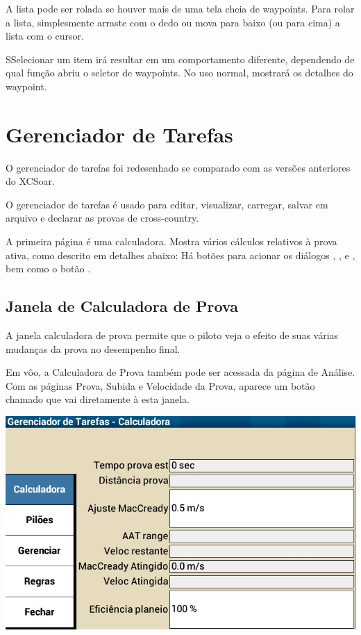 A lista pode ser rolada se houver mais de uma tela cheia de waypoints.  Para rolar a lista, simplesmente arraste com o dedo ou mova para baixo (ou para cima) a lista com o cursor. 

SSelecionar um item irá resultar em um comportamento diferente, dependendo de qual função abriu o seletor de waypoints.  No uso normal, mostrará os detalhes do waypoint.

\section{Gerenciador de Tarefas}\label{sec:task-manager-dialog}
\begin{it}  O gerenciador de tarefas foi redesenhado se comparado com as versões anteriores do XCSoar.\end{it}

O gerenciador de tarefas é usado para editar, visualizar, carregar, salvar em arquivo e declarar as provas de cross-country.

A primeira página é uma calculadora.  Mostra vários cálculos relativos à prova ativa, como descrito em detalhes abaixo:  Há botões para acionar os diálogos , , 
e , bem como o botão  .

\subsection*{Janela de Calculadora de Prova}\label{sec:task-calc-dial}
A janela calculadora de prova permite que o piloto veja o efeito de suas várias mudanças da prova no desempenho final.

Em vôo, a Calculadora de Prova também pode ser acessada da página de Análise.  Com as páginas Prova, Subida e Velocidade da Prova, aparece um botão chamado   que vai diretamente à esta janela.
 



\begin{center}
\includegraphics[angle=0,width=0.8\linewidth,keepaspectratio='true']{figures/dialog-taskcalculator.png}
\end{center}

